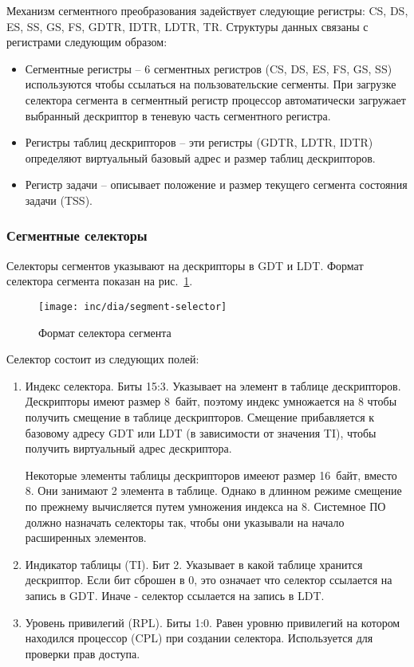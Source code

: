 Механизм сегментного преобразования задействует следующие регистры: CS, DS, ES, SS, GS, FS, GDTR, IDTR, LDTR, TR.
Структуры данных связаны с регистрами следующим образом:
\begin{itemize}
	\item Сегментные регистры -- 6 сегментных регистров (CS, DS, ES, FS, GS, SS) используются чтобы ссылаться
		на пользовательские сегменты. При загрузке селектора сегмента в сегментный регистр процессор
		автоматически загружает выбранный дескриптор в теневую часть сегментного регистра.
	\item Регистры таблиц дескрипторов -- эти регистры (GDTR, LDTR, IDTR) определяют виртуальный базовый адрес и
		размер таблиц дескрипторов.
	\item Регистр задачи -- описывает положение и размер текущего сегмента состояния задачи (TSS).
\end{itemize}

\subsubsection*{Сегментные селекторы}
Селекторы сегментов указывают на дескрипторы в GDT и LDT.
Формат селектора сегмента показан на рис.~\ref{fig:segment-selector}.

\begin{figure}
  \centering
  \texttt{[image: inc/dia/segment-selector]}
  \caption{Формат селектора сегмента}
  \label{fig:segment-selector}
\end{figure}

Селектор состоит из следующих полей:
\begin{enumerate}
\item Индекс селектора. Биты 15:3. Указывает на элемент в таблице дескрипторов.
	Дескрипторы имеют размер 8~байт, поэтому индекс умножается на 8
	чтобы получить смещение в таблице дескрипторов. Смещение прибавляется
	к базовому адресу GDT или LDT (в зависимости от значения TI), чтобы получить
	виртуальный адрес дескриптора.

	Некоторые элементы таблицы дескрипторов имееют размер 16~байт, вместо 8.
	Они занимают 2 элемента в таблице. Однако в длинном режиме смещение по
	прежнему вычисляется путем умножения индекса на 8. Системное ПО должно
	назначать селекторы так, чтобы они указывали на начало расширенных элементов.

\item Индикатор таблицы (TI). Бит 2. Указывает в какой таблице хранится дескриптор.
	Если бит сброшен в 0, это означает что селектор ссылается на запись в GDT.
	Иначе - селектор ссылается на запись в LDT.
\item Уровень привилегий (RPL). Биты 1:0. Равен уровню привилегий на котором
	находился процессор (CPL) при создании селектора. Используется для проверки прав доступа.
\end{enumerate}

